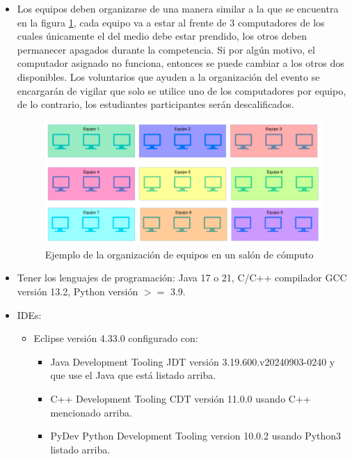 \documentclass{article}
\begin{document}
\begin{itemize}
  \item Los equipos deben organizarse de una manera similar a la que se encuentra en la figura \ref{fig:sala-equipos}, cada equipo va a estar al frente de 3 computadores de los cuales únicamente el del medio debe estar prendido, los otros deben permanecer apagados durante la competencia. Si por algún motivo, el computador asignado no funciona, entonces se puede cambiar a los otros dos disponibles. Los voluntarios que ayuden a la organización del evento se encargarán de vigilar que solo se utilice uno de los computadores por equipo, de lo contrario, los estudiantes participantes serán descalificados.

        \begin{figure}[h]
          \centering
          \includegraphics[width=\textwidth]{Assets/Equipos.png}
          \caption{Ejemplo de la organización de equipos en un salón de cómputo }
          \label{fig:sala-equipos}
        \end{figure}
  \item Tener los lenguajes de programación: Java 17 o 21, C/C++ compilador GCC versión 13.2, Python versión \(>=\) 3.9.
  \item IDEs:
        \begin{itemize}
          \item Eclipse versión 4.33.0 configurado con:
                \begin{itemize}
                  \item Java Development Tooling JDT versión 3.19.600.v20240903-0240 y que use el Java que está listado arriba.
                  \item C++ Development Tooling CDT versión 11.0.0 usando C++ mencionado arriba.
                  \item PyDev Python Development Tooling version 10.0.2 usando Python3 listado arriba.
                \end{itemize}

\end{itemize}
\end{itemize}
\end{document}
